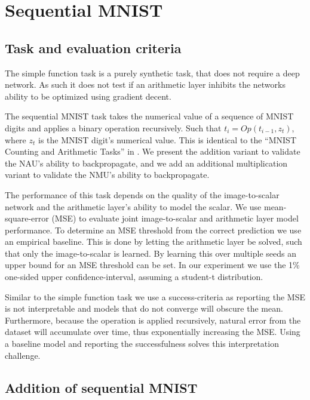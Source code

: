 \section{Sequential MNIST}

\subsection{Task and evaluation criteria}
The simple function task is a purely synthetic task, that does not require a deep network. As such it does not test if an arithmetic layer inhibits the networks ability to be optimized using gradient decent.

The sequential MNIST task takes the numerical value of a sequence of MNIST digits and applies a binary operation recursively. Such that $t_i = Op(t_{i-1}, z_t)$, where $z_t$ is the MNIST digit's numerical value. This is identical to the ``MNIST Counting and Arithmetic Tasks'' in \citet[section 4.2]{trask-nalu}. We present the addition variant to validate the NAU's ability to backpropagate, and we add an additional multiplication variant to validate the NMU's ability to backpropagate.

The performance of this task depends on the quality of the image-to-scalar network and the arithmetic layer's ability to model the scalar. We use mean-square-error (MSE) to evaluate joint image-to-scalar and arithmetic layer model performance. To determine an MSE threshold from the correct prediction we use an empirical baseline. This is done by letting the arithmetic layer be solved, such that only the image-to-scalar is learned. By learning this over multiple seeds an upper bound for an MSE threshold can be set. In our experiment we use the 1\% one-sided upper confidence-interval, assuming a student-t distribution.

Similar to the simple function task we use a success-criteria as reporting the MSE is not interpretable and models that do not converge will obscure the mean. Furthermore, because the operation is applied recursively, natural error from the dataset will accumulate over time, thus exponentially increasing the MSE. Using a baseline model and reporting the successfulness solves this interpretation challenge.

\subsection{Addition of sequential MNIST}
\label{sec:appendix:mnist:addition-experiment}

